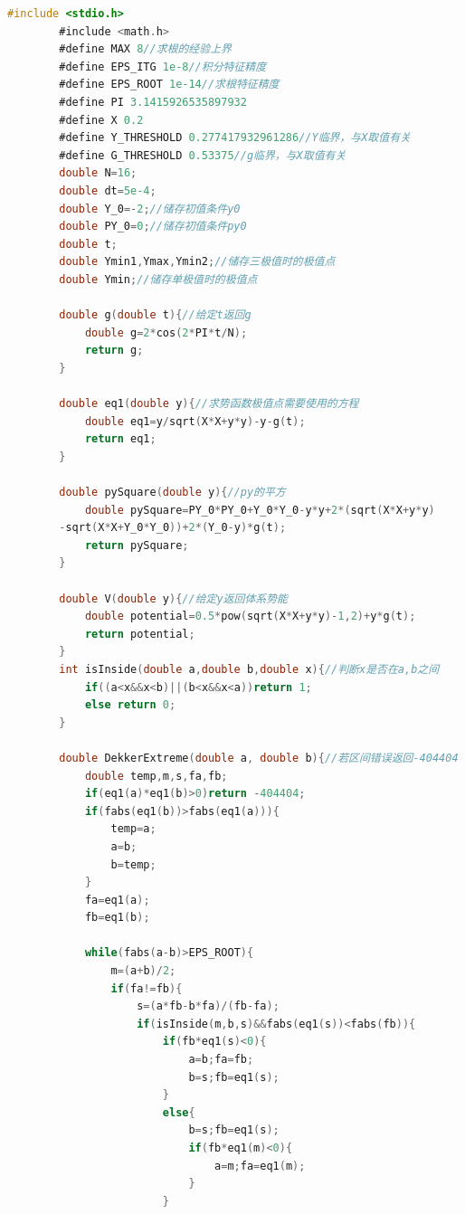 \documentclass[10pt, a4paper]{article}
\begin{document}
    \begin{lstlisting}[language=C]
        #include <stdio.h>
        #include <math.h>
        #define MAX 8//求根的经验上界
        #define EPS_ITG 1e-8//积分特征精度
        #define EPS_ROOT 1e-14//求根特征精度
        #define PI 3.1415926535897932
        #define X 0.2
        #define Y_THRESHOLD 0.277417932961286//Y临界，与X取值有关
        #define G_THRESHOLD 0.53375//g临界，与X取值有关
        double N=16;
        double dt=5e-4;
        double Y_0=-2;//储存初值条件y0
        double PY_0=0;//储存初值条件py0
        double t;
        double Ymin1,Ymax,Ymin2;//储存三极值时的极值点
        double Ymin;//储存单极值时的极值点
        
        double g(double t){//给定t返回g
            double g=2*cos(2*PI*t/N);
            return g;
        }
        
        double eq1(double y){//求势函数极值点需要使用的方程
            double eq1=y/sqrt(X*X+y*y)-y-g(t);
            return eq1;
        }
        
        double pySquare(double y){//py的平方
            double pySquare=PY_0*PY_0+Y_0*Y_0-y*y+2*(sqrt(X*X+y*y)
        -sqrt(X*X+Y_0*Y_0))+2*(Y_0-y)*g(t);
            return pySquare;
        }
        
        double V(double y){//给定y返回体系势能
            double potential=0.5*pow(sqrt(X*X+y*y)-1,2)+y*g(t);
            return potential;
        }
        int isInside(double a,double b,double x){//判断x是否在a,b之间
            if((a<x&&x<b)||(b<x&&x<a))return 1;
            else return 0;
        }
        
        double DekkerExtreme(double a, double b){//若区间错误返回-404404
            double temp,m,s,fa,fb;
            if(eq1(a)*eq1(b)>0)return -404404;
            if(fabs(eq1(b))>fabs(eq1(a))){
                temp=a;
                a=b;
                b=temp;
            }
            fa=eq1(a);
            fb=eq1(b);
        
            while(fabs(a-b)>EPS_ROOT){
                m=(a+b)/2;
                if(fa!=fb){
                    s=(a*fb-b*fa)/(fb-fa);
                    if(isInside(m,b,s)&&fabs(eq1(s))<fabs(fb)){
                        if(fb*eq1(s)<0){
                            a=b;fa=fb;
                            b=s;fb=eq1(s);
                        }
                        else{
                            b=s;fb=eq1(s);
                            if(fb*eq1(m)<0){
                                a=m;fa=eq1(m);
                            }
                        }
        

\end{lstlisting}
\end{document}

